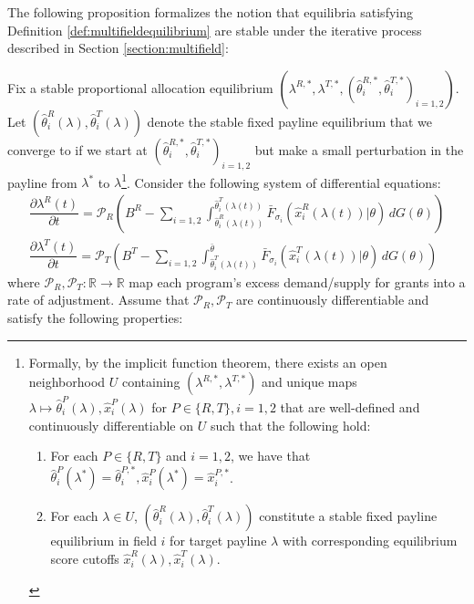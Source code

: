 \noindent The following proposition formalizes the notion that equilibria satisfying Definition \ref{def:multifieldequilibrium} are stable under the iterative process described in Section \ref{section:multifield}: 

\begin{proposition}\label{prop:multifield_stability}
Fix a stable proportional allocation equilibrium $(\lambda^{R,*},\lambda^{T,*}, (\hat{\theta}^{R,*}_i, \hat{\theta}^{T,*}_i)_{i=1,2})$. Let $(\hat{\theta}^{R}_i(\lambda),\hat{\theta}^{T}_i(\lambda))$ denote the stable fixed payline equilibrium that we converge to if we start at $(\hat{\theta}^{R,*}_i, \hat{\theta}^{T,*}_i)_{i=1,2}$ but make a small perturbation in the payline from $\lambda^*$ to $\lambda$\footnote{Formally, by the implicit function theorem, there exists an open neighborhood $U$ containing $(\lambda^{R,*},\lambda^{T,*})$ and unique maps $\lambda\mapsto \hat{\theta}^{P}_i(\lambda),\hat{x}^{P}_i(\lambda)$ for $ P\in \{R,T\}, i=1,2$ that are well-defined and continuously differentiable on $U$ such that the following hold:
\vspace{-5pt}
\begin{enumerate}[label=(\arabic*),ref=\theproposition(\arabic*)]
   \item For each $P\in \{R,T\}$ and $i=1,2$, we have that $\hat{\theta}^{P}_i(\lambda^*) = \hat{\theta}_i^{P,*}, \hat{x}^P_i(\lambda^*) = \hat{x}_i^{P,*}$.
   \item For each $\lambda\in U$, $(\hat{\theta}^{R}_i(\lambda),\hat{\theta}^T_i(\lambda))$ constitute a stable fixed payline equilibrium in field $i$ for target payline $\lambda$ with corresponding equilibrium score cutoffs $\hat{x}^R_i(\lambda),\hat{x}^T_i(\lambda)$. 
\end{enumerate}}. Consider the following system of differential equations:
\begin{align}\label{eq:rateofadjustment}
  \dfrac{\partial \lambda^R(t)}{\partial t} = \mathcal{P}_R\left(B^R - \sum_{i=1,2}\int_{\hat{\theta}_i^{R}(\lambda(t))}^{\hat{\theta}_i^{T}(\lambda(t))}\bar{F}_{\sigma_i}(\hat{x}^{R}_i(\lambda(t))|\theta) \,dG(\theta)\right) \\ 
  \dfrac{\partial \lambda^T(t)}{\partial t} = \mathcal{P}_T\left(B^T -  \sum_{i=1,2}\int_{\hat{\theta}_i^{T}(\lambda(t))}^{\bar{\theta}}\bar{F}_{\sigma_i}(\hat{x}^T_i(\lambda(t))|\theta) \,dG(\theta)\right)
\end{align}
where $\mathcal{P}_R,\mathcal{P}_T:\mathbb{R}\rightarrow \mathbb{R}$ map each program's excess demand/supply for grants into a rate of adjustment. Assume that $\mathcal{P}_R,\mathcal{P}_T$ are continuously differentiable and satisfy the following properties:

\end{proposition}
